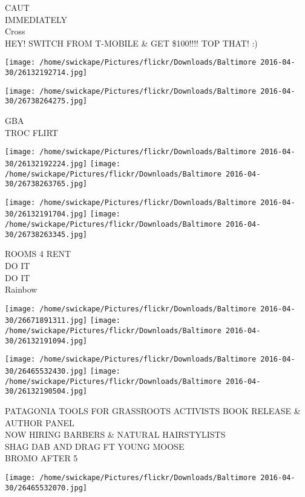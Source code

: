 \documentclass[10pt,letterpaper]{article}
\begin{document}
CAUT\\
IMMEDIATELY\\
Cross\\
HEY!  SWITCH FROM T{-}MOBILE \& GET \$100!!!! TOP THAT! :)\\
\pagebreak

\texttt{[image: /home/swickape/Pictures/flickr/Downloads/Baltimore 2016-04-30/26132192714.jpg]}

\vspace{0.25in}
\texttt{[image: /home/swickape/Pictures/flickr/Downloads/Baltimore 2016-04-30/26738264275.jpg]}

GBA\\
TROC FLIRT\\
\pagebreak

\texttt{[image: /home/swickape/Pictures/flickr/Downloads/Baltimore 2016-04-30/26132192224.jpg]}
\texttt{[image: /home/swickape/Pictures/flickr/Downloads/Baltimore 2016-04-30/26738263765.jpg]}

\texttt{[image: /home/swickape/Pictures/flickr/Downloads/Baltimore 2016-04-30/26132191704.jpg]}
\texttt{[image: /home/swickape/Pictures/flickr/Downloads/Baltimore 2016-04-30/26738263345.jpg]}

ROOMS 4 RENT\\
DO IT\\
DO IT\\
Rainbow\\
\pagebreak

\texttt{[image: /home/swickape/Pictures/flickr/Downloads/Baltimore 2016-04-30/26671891311.jpg]}
\texttt{[image: /home/swickape/Pictures/flickr/Downloads/Baltimore 2016-04-30/26132191094.jpg]}

\texttt{[image: /home/swickape/Pictures/flickr/Downloads/Baltimore 2016-04-30/26465532430.jpg]}
\texttt{[image: /home/swickape/Pictures/flickr/Downloads/Baltimore 2016-04-30/26132190504.jpg]}

PATAGONIA TOOLS FOR GRASSROOTS ACTIVISTS BOOK RELEASE \& AUTHOR PANEL\\
NOW HIRING BARBERS \& NATURAL HAIRSTYLISTS\\
SHAG DAB AND DRAG FT YOUNG MOOSE\\
BROMO AFTER 5\\
\pagebreak

\texttt{[image: /home/swickape/Pictures/flickr/Downloads/Baltimore 2016-04-30/26465532070.jpg]}
\end{document}
